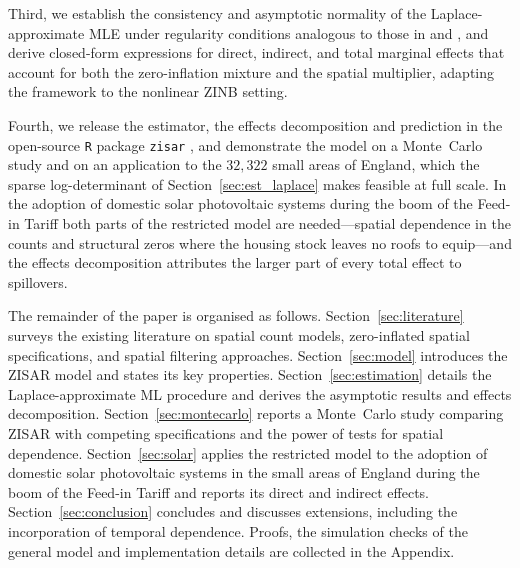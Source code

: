 Third, we establish the consistency and asymptotic normality of the Laplace-approximate MLE under regularity conditions analogous to those in \citet{lee2004} and \citet{newey_mcfadden1994}, and derive closed-form expressions for direct, indirect, and total marginal effects that account for both the zero-inflation mixture and the spatial multiplier, adapting the \citet{lesage_pace2009} framework to the nonlinear ZINB setting.

Fourth, we release the estimator, the effects decomposition and prediction in the open-source \texttt{R} package \texttt{zisar} \citep{zisar_pkg}, and demonstrate the model on a Monte~Carlo study and on an application to the $32{,}322$ small areas of England, which the sparse log-determinant of Section~\ref{sec:est_laplace} makes feasible at full scale.
In the adoption of domestic solar photovoltaic systems during the boom of the Feed-in Tariff both parts of the restricted model are needed---spatial dependence in the counts and structural zeros where the housing stock leaves no roofs to equip---and the effects decomposition attributes the larger part of every total effect to spillovers.

The remainder of the paper is organised as follows.
Section~\ref{sec:literature} surveys the existing literature on spatial count models, zero-inflated spatial specifications, and spatial filtering approaches.
Section~\ref{sec:model} introduces the ZISAR model and states its key properties.
Section~\ref{sec:estimation} details the Laplace-approximate ML procedure and derives the asymptotic results and effects decomposition.
Section~\ref{sec:montecarlo} reports a Monte~Carlo study comparing ZISAR with competing specifications and the power of tests for spatial dependence.
Section~\ref{sec:solar} applies the restricted model to the adoption of domestic solar photovoltaic systems in the small areas of England during the boom of the Feed-in Tariff and reports its direct and indirect effects.
Section~\ref{sec:conclusion} concludes and discusses extensions, including the incorporation of temporal dependence.
Proofs, the simulation checks of the general model and implementation details are collected in the Appendix.
